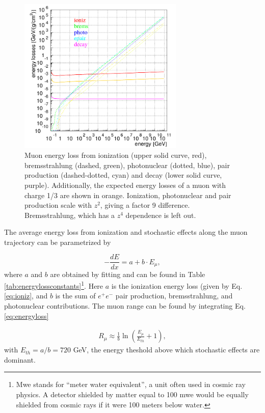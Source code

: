 \begin{figure}[t]
\centering
\includegraphics[width = 0.7\textwidth]{chapter4/img/muonenergyloss_extra.png}
\caption{Muon energy loss from ionization (upper solid curve, red), bremsstrahlung (dashed, green), photonuclear (dotted, blue), pair production (dashed-dotted, cyan) and decay (lower solid curve, purple). Additionally, the expected energy losses of a muon with charge 1/3 are shown in orange. Ionization, photonuclear and pair production scale with $z^2$, giving a factor 9 difference. Bremsstrahlung, which has a $z^4$ dependence is left out.}
\label{fig:energyloss}
\end{figure}

\noindent The average energy loss from ionization and stochastic effects along the muon trajectory can be parametrized by \cite{Barrett:1952woo} 

\begin{equation}
\label{eq:energyloss}
- \frac{dE}{dx} = a + b \cdot E_\mu,
\end{equation}
where $a$ and $b$ are obtained by fitting and can be found in Table \ref{tab:energylossconstants}\footnote{Mwe stands for ``meter water equivalent'', a unit often used in cosmic ray physics. A detector shielded by matter equal to 100 mwe would be equally shielded from cosmic rays if it were 100 meters below water.}. Here $a$ is the ionization energy loss (given by Eq. \ref{eq:ioniz}, and $b$ is the sum of $e^+e^-$ pair production, bremsstrahlung, and photonuclear contributions. The muon range can be found by integrating Eq. \ref{eq:energyloss}

\begin{equation}
\begin{split}
R_\mu \approx \frac{1}{b} \ln \left( \frac{E_\mu}{E_{th}} +1 \right),
\end{split}
\end{equation}
with $E_{th} = a/b = 720$ GeV, the energy theshold above which stochastic effects are dominant.


